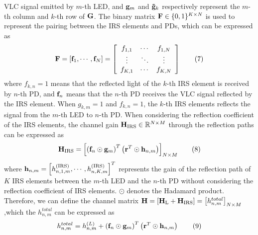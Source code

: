\documentclass[conference]{IEEEtran}
\begin{document}
   VLC signal emitted by $m$-th LED, and ${{\bf{g}}_m}$ and 
   ${{\bf{\tilde g}}_k}$ respectively represent the $m$-th column
   and $k$-th row of ${\bf{G}}$.
   The binary matrix 
   ${\bf{F}} \in {\{ 0,1\} ^{K \times N}}$ is used to 
   represent the pairing between the IRS elements and PDs, 
   which can be expressed as
     \begin{equation}
     {\bf{F}} = [{{\bf{f}}_1}, \cdots ,{{\bf{f}}_N}] = \left[ {\begin{array}{*{20}{c}}
     {{f_{1,1}}}& \cdots &{{f_{1,N}}}\\
     \vdots & \ddots & \vdots \\
     {{f_{K,1}}}& \cdots &{{f_{K,N}}}
     \end{array}} \right]
     \tag{7}\label{eq7}
     \end{equation}
   where ${f_{k,n}} = 1$ means that the reflected light of the $k$-th IRS 
   element is received by $n$-th PD, and ${{\bf{f}}_n}$ means 
   that the $n$-th PD 
   receives the VLC signal reflected by the IRS element. 
   When ${g_{k,m}} = 1$ and ${f_{k,n}} = 1$, the $k$-th IRS elements reflects 
   the signal from the $m$-th LED to $n$-th PD. 
   When considering the reflection 
   coefficient of the IRS elements, the channel gain 
   ${{\bf{H}}_{\rm{IRS}}} \in {\mathbb{R} ^{N \times M}}$ through the reflection 
   paths can be expressed as
     \begin{equation}
     {{\bf{H}}_{\rm{IRS}}} = {\left[ {{{\left( {{{\bf{f}}_n} \odot {{\bf{g}}_m}} \right)}^T}\left( {{{\bf{r}}^T} \odot {{\bf{h}}_{n,m}}} \right)} \right]_{N \times M}}
     \tag{8}\label{8}
     \end{equation}
   where ${{\bf{h}}_{n,m}} = {\left[ {h_{n,1,m}^{\rm{(IRS)}}, \cdots ,h_{n,K,m}^{\rm{(IRS)}}} \right]^T}$ 
   represents the gain of the reflection path of $K$ IRS elements between 
   the $m$-th LED and the $n$-th PD without considering the reflection 
   coefficient of IRS elements. $ \odot $ denotes the Hadamard product. 
   Therefore, we can define the channel matrix
   ${\bf{H}} = \left[ {{{\bf{H}}_{\rm{L}}} + {{\bf{H}}_{{\rm{IRS}}}}} \right] = {\left[ {h_{n,m}^{total}} \right]_{N \times M}}$ 
   ,which the ${h_{n,m}^{total}}$ can be expressed as
     \begin{equation}
     h_{n,m}^{total} = h_{n,m}^{(L)} + {\left( {{{\bf{f}}_n} \odot {{\bf{g}}_m}} \right)^T}\left( {{{\bf{r}}^T} \odot {{\bf{h}}_{n,m}}} \right)
     \tag{9}\label{9}
     \end{equation}
\end{document}
